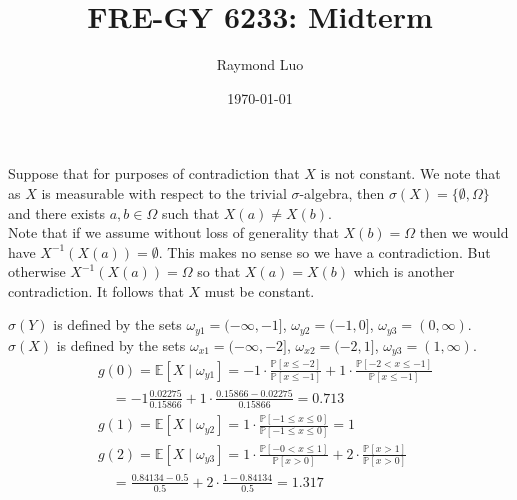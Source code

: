 \documentclass[12pt,twoside, letter]{exam}
\theoremstyle{definition}
\newcommand{\ee}{\mathbb{E}}
\newcommand{\pp}{\mathbb{P}}
\begin{document}
\abovedisplayskip=12pt
\belowdisplayskip=12pt
\abovedisplayshortskip=7pt
\belowdisplayshortskip=10pt
\allowdisplaybreaks

\setlength{\parindent}{18pt}

\title{FRE-GY 6233: Midterm}
\author{Raymond Luo}
\date{\today}
\maketitle

\begin{solution}
  Suppose that for purposes of contradiction that $X$ is not constant. We note that as $X$ is measurable with respect to the trivial $\sigma$-algebra,
  then $\sigma(X) = \{\emptyset, \Omega\}$ and there exists $a, b \in \Omega$ such that $X(a) \neq X(b)$. \\
  Note that if we assume without loss of generality that $X(b) = \Omega$ then we would have $X^{-1}(X(a)) = \emptyset$.
  This makes no sense so we have a contradiction. But otherwise $X^{-1}(X(a)) = \Omega$ so that $X(a) = X(b)$ which is another contradiction.
  It follows that $X$ must be constant.
\end{solution}

\begin{solution}
  $\sigma(Y)$ is defined by the sets $\omega_{y1} = (-\infty, -1]$, $\omega_{y2} =(-1,0]$, $\omega_{y3} = (0, \infty)$.
  $\sigma(X)$ is defined by the sets $\omega_{x1} = (-\infty, -2]$, $\omega_{x2} =(-2,1]$, $\omega_{y3} = (1, \infty)$. \\
  \begin{align*}
    &g(0) = \ee[X \mid \omega_{y1}] = -1 \cdot \frac{\pp[x \leq -2]}{\pp[x \leq -1]} + 1 \cdot \frac{\pp[-2 < x \leq -1]}{\pp[x \leq -1]}  \\
    & \quad = -1 \frac{0.02275}{0.15866} + 1 \cdot \frac{0.15866 - 0.02275}{0.15866} = 0.713 \\
    &g(1) = \ee[X \mid \omega_{y2}] = 1 \cdot \frac{\pp[-1 \leq x \leq 0]}{\pp[-1 \leq x \leq 0]} = 1 \\
    &g(2) = \ee[X \mid \omega_{y3}] = 1 \cdot \frac{\pp[-0 < x \leq 1]}{\pp[x > 0]} + 2 \cdot \frac{\pp[x > 1]}{\pp[x > 0]} \\
    & \quad = \frac{0.84134 - 0.5}{0.5} + 2 \cdot \frac{1 - 0.84134}{0.5} = 1.317
  \end{align*}
\end{solution}
\end{document}
